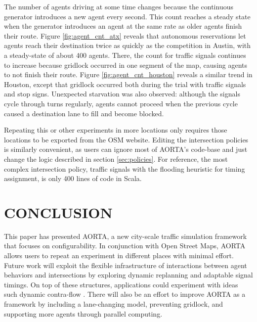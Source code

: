 \documentclass[letterpaper, 10 pt, conference]{ieeeconf}  %
\begin{document}
The number of agents driving at some time changes because the continuous
generator introduces a new agent every second. This count reaches a steady state
when the generator introduces an agent at the same rate as older agents finish
their route. Figure \ref{fig:agent_cnt_atx} reveals that autonomous reservations
let agents reach their destination twice as quickly as the competition in
Austin, with a steady-state of about 400 agents. There, the count for traffic
signals continues to increase because gridlock occurred in one segment of the
map, causing agents to not finish their route. Figure
\ref{fig:agent_cnt_houston} reveals a similar trend in Houston, except that
gridlock occurred both during the trial with traffic signals and stop signs.
Unexpected starvation was also observed: although the signals cycle through
turns regularly, agents cannot proceed when the previous cycle caused a
destination lane to fill and become blocked.

Repeating this or other experiments in more locations only requires those
locations to be exported from the OSM website. Editing the intersection policies
is similarly convenient, as users can ignore most of AORTA's code-base and just
change the logic described in section \ref{sec:policies}.  For reference, the
most complex intersection policy, traffic signals with the flooding heuristic
for timing assignment, is only 400 lines of code in Scala.


\section{CONCLUSION}
\label{sec:conclusion}

This paper has presented AORTA, a new city-scale traffic simulation framework
that focuses on configurability. In conjunction with Open Street Maps, AORTA
allows users to repeat an experiment in different places with minimal effort.
Future work will exploit the flexible infrastructure of interactions between
agent behaviors and intersections by exploring dynamic replanning and adaptable
signal timings. On top of these structures, applications could experiment with
ideas such dynamic contra-flow \cite{ITSC11-hausknecht}.  There will also be an
effort to improve AORTA as a framework by including a lane-changing model,
preventing gridlock, and supporting more agents through parallel computing.

\end{document}
